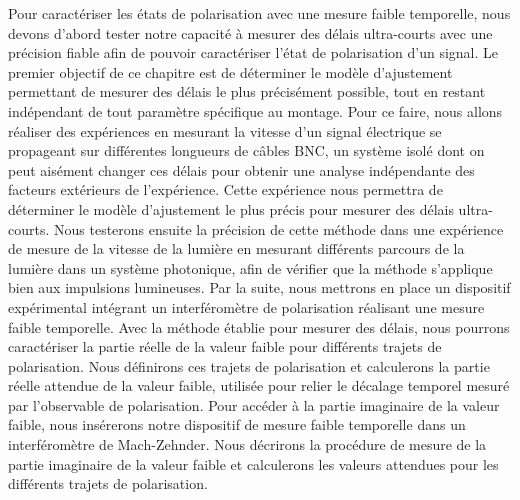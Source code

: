 \begin{onehalfspace}
    Pour caractériser les états de polarisation avec une mesure faible 
    temporelle, nous devons d'abord tester notre capacité à mesurer des 
    délais ultra-courts avec une précision fiable afin de pouvoir 
    caractériser l'état de polarisation d'un signal.
    Le premier objectif de ce chapitre est de déterminer le modèle
    d'ajustement permettant de mesurer des délais le plus précisément
    possible, tout en restant indépendant de tout paramètre
    spécifique au montage. Pour ce faire, nous allons réaliser des expériences en mesurant la 
    vitesse d’un signal électrique se propageant sur différentes longueurs de câbles BNC,
    un système isolé dont on peut aisément changer ces délais pour obtenir
    une analyse indépendante des facteurs extérieurs de l'expérience.
    Cette expérience nous permettra de déterminer le modèle d'ajustement
    le plus précis pour mesurer des délais ultra-courts.
    Nous testerons ensuite la précision de cette 
    méthode dans une expérience de mesure de la vitesse de la lumière en mesurant
    différents parcours de la lumière dans un système photonique,
    afin de vérifier que la méthode s'applique bien aux impulsions
    lumineuses. Par la suite, nous mettrons en place un dispositif expérimental
    intégrant un interféromètre de polarisation réalisant une mesure faible
    temporelle. Avec la méthode établie pour mesurer des délais,
    nous pourrons caractériser la partie réelle de la valeur faible
    pour différents trajets de polarisation. Nous définirons ces trajets de polarisation et calculerons la partie
    réelle attendue de la valeur faible, utilisée pour relier le décalage
    temporel mesuré par l'observable de polarisation. Pour accéder à la partie
    imaginaire de la valeur faible, nous insérerons notre dispositif
    de mesure faible temporelle dans un interféromètre de Mach-Zehnder.
    Nous décrirons la procédure de mesure de la partie imaginaire de la valeur faible
    et calculerons les valeurs attendues pour les différents trajets de polarisation.
\end{onehalfspace}
